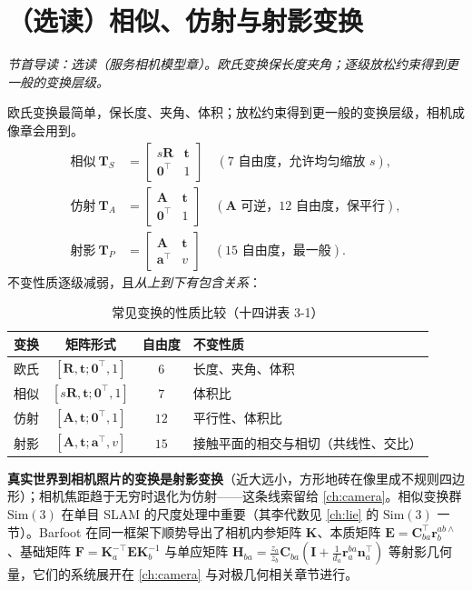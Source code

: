 \section{（选读）相似、仿射与射影变换}
\label{sec:rb-projective}
\noindent\emph{节首导读：选读（服务相机模型章）。欧氏变换保长度夹角；逐级放松约束得到更一般的变换层级。}

欧氏变换最简单，保长度、夹角、体积；放松约束得到更一般的变换层级，相机成像章会用到\cite{gaoxiang2019slam14}。
\begin{align}
  \text{相似}\ \mathbf{T}_S&=\begin{bmatrix}s\mathbf{R}&\mathbf{t}\\\mathbf{0}^\top&1\end{bmatrix}\quad(7\text{ 自由度，允许均匀缩放 }s),\\
  \text{仿射}\ \mathbf{T}_A&=\begin{bmatrix}\mathbf{A}&\mathbf{t}\\\mathbf{0}^\top&1\end{bmatrix}\quad(\mathbf{A}\text{ 可逆，}12\text{ 自由度，保平行}),\\
  \text{射影}\ \mathbf{T}_P&=\begin{bmatrix}\mathbf{A}&\mathbf{t}\\\mathbf{a}^\top&v\end{bmatrix}\quad(15\text{ 自由度，最一般}).
\end{align}
不变性质逐级减弱，且\emph{从上到下有包含关系}：
\begin{table}[H]\centering\small
\caption{常见变换的性质比较（十四讲表 3-1）}
\label{tab:rb-transforms}
\begin{tabular}{lccl}
\toprule
变换 & 矩阵形式 & 自由度 & 不变性质 \\
\midrule
欧氏 & $[\mathbf{R},\mathbf{t};\mathbf{0}^\top,1]$ & $6$ & 长度、夹角、体积 \\
相似 & $[s\mathbf{R},\mathbf{t};\mathbf{0}^\top,1]$ & $7$ & 体积比 \\
仿射 & $[\mathbf{A},\mathbf{t};\mathbf{0}^\top,1]$ & $12$ & 平行性、体积比 \\
射影 & $[\mathbf{A},\mathbf{t};\mathbf{a}^\top,v]$ & $15$ & 接触平面的相交与相切（共线性、交比）\\
\bottomrule
\end{tabular}
\end{table}

\noindent\textbf{真实世界到相机照片的变换是射影变换}（近大远小，方形地砖在像里成不规则四边形）；相机焦距趋于无穷时退化为仿射——这条线索留给 \cref{ch:camera}。相似变换群 $\mathrm{Sim}(3)$ 在单目 SLAM 的尺度处理中重要（其李代数见 \cref{ch:lie} 的 $\mathrm{Sim}(3)$ 一节）。Barfoot 在同一框架下顺势导出了相机内参矩阵 $\mathbf{K}$、本质矩阵 $\mathbf{E}=\mathbf{C}_{ba}^\top\mathbf{r}_b^{ab\wedge}$、基础矩阵 $\mathbf{F}=\mathbf{K}_a^{-\top}\mathbf{E}\mathbf{K}_b^{-1}$ 与单应矩阵 $\mathbf{H}_{ba}=\tfrac{z_a}{z_b}\mathbf{C}_{ba}(\mathbf{I}+\tfrac{1}{d_a}\mathbf{r}_a^{ba}\mathbf{n}_a^\top)$ 等射影几何量\cite{barfoot2024state}，它们的系统展开在 \cref{ch:camera} 与对极几何相关章节进行。

